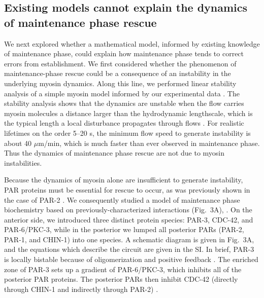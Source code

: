 \documentclass[11pt]{article}
\newcommand{\6}[1]{#1_{\text{6}}}
\newcommand{\3}[1]{#1_{\text{3}}}
\begin{document}
\subsection*{Existing models cannot explain the dynamics of maintenance phase rescue }
We next explored whether a mathematical model, informed by existing knowledge of maintenance phase, could explain how maintenance phase tends to correct errors from establishment. We first considered whether the phenomenon of maintenance-phase rescue could be a consequence of an instability in the underlying myosin dynamics. Along this line, we performed linear stability analysis of a simple myosin model informed by our experimental data \citep{mayer2010anisotropies, bois2011pattern}. The stability analysis shows that the dynamics are unstable when the flow carries myosin molecules a distance larger than the hydrodynamic lengthscale, which is the typical length a local disturbance propagates through flows \citep{mayer2010anisotropies}. For realistic lifetimes on the order 5--20 s, the minimum flow speed to generate instability is about 40 $\mu$m/min, which is much faster than ever observed in maintenance phase. Thus the dynamics of maintenance phase rescue are not due to myosin instabilities.

Because the dynamics of myosin alone are insufficient to generate instability, PAR proteins must be essential for rescue to occur, as was previously shown in the case of PAR-2 \citep{zonies2010symmetry}. We consequently studied a model of maintenance phase biochemistry based on previously-characterized interactions (Fig.\ 3A), \citep{lang2017proteins}. On the anterior side, we introduced three distinct protein species: PAR-3, CDC-42, and PAR-6/PKC-3, while in the posterior we lumped all posterior PARs (PAR-2, PAR-1, and CHIN-1) into one species. A schematic diagram is given in Fig.\ 3A, and the equations which describe the circuit are given in the SI. In brief, PAR-3 is locally bistable because of oligomerization and positive feedback \cite{lang2023oligomerization}. The enriched zone of PAR-3 sets up a gradient of PAR-6/PKC-3, which inhibits all of the posterior PAR proteins. The posterior PARs then inhibit CDC-42 (directly through CHIN-1 and indirectly through PAR-2) \citep{munro2004cortical, sailer2015dynamic}. 
\end{document}
